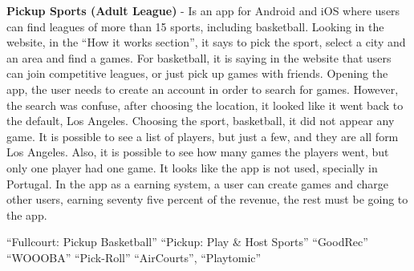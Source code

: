 \textbf{Pickup Sports (Adult League)}\cite{pickup-adult, pickup-adult-app} - Is an app for Android and iOS where users can find leagues of more than 15 sports, including basketball.
Looking in the website\cite{pickup-adult}, in the ``How it works section'', it says to pick the sport, select a city and an area and find a games.
For basketball, it is saying in the website that users can join competitive leagues, or just pick up games with friends.
Opening the app, the user needs to create an account in order to search for games.
However, the search was confuse, after choosing the location, it looked like it went back to the default, Los Angeles.
Choosing the sport, basketball, it did not appear any game.
It is possible to see a list of players, but just a few, and they are all form Los Angeles.
Also, it is possible to see how many games the players went, but only one player had one game.
It looks like the app is not used, specially in Portugal.
In the app as a earning system, a user can create games and charge other users, earning seventy five percent of the revenue, the rest must be going to the app.


``Fullcourt: Pickup Basketball''\cite{fullcourt}
``Pickup: Play \& Host Sports''\cite{pickup, pickup-app}
``GoodRec''\cite{goodrec}
``WOOOBA''\cite{woooba}
``Pick-Roll''\cite{pick-roll}
``AirCourts''\cite{aircourts},
``Playtomic''\cite{playtonic}















































